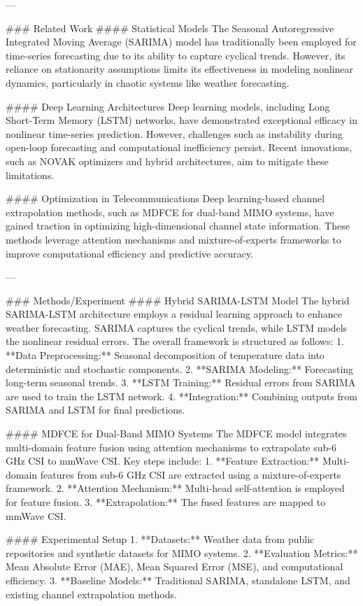 ---

### Related Work
#### Statistical Models
The Seasonal Autoregressive Integrated Moving Average (SARIMA) model has traditionally been employed for time-series forecasting due to its ability to capture cyclical trends. However, its reliance on stationarity assumptions limits its effectiveness in modeling nonlinear dynamics, particularly in chaotic systems like weather forecasting.

#### Deep Learning Architectures
Deep learning models, including Long Short-Term Memory (LSTM) networks, have demonstrated exceptional efficacy in nonlinear time-series prediction. However, challenges such as instability during open-loop forecasting and computational inefficiency persist. Recent innovations, such as NOVAK optimizers and hybrid architectures, aim to mitigate these limitations.

#### Optimization in Telecommunications
Deep learning-based channel extrapolation methods, such as MDFCE for dual-band MIMO systems, have gained traction in optimizing high-dimensional channel state information. These methods leverage attention mechanisms and mixture-of-experts frameworks to improve computational efficiency and predictive accuracy.

---

### Methods/Experiment
#### Hybrid SARIMA-LSTM Model
The hybrid SARIMA-LSTM architecture employs a residual learning approach to enhance weather forecasting. SARIMA captures the cyclical trends, while LSTM models the nonlinear residual errors. The overall framework is structured as follows:
1. **Data Preprocessing:** Seasonal decomposition of temperature data into deterministic and stochastic components.
2. **SARIMA Modeling:** Forecasting long-term seasonal trends.
3. **LSTM Training:** Residual errors from SARIMA are used to train the LSTM network.
4. **Integration:** Combining outputs from SARIMA and LSTM for final predictions.

#### MDFCE for Dual-Band MIMO Systems
The MDFCE model integrates multi-domain feature fusion using attention mechanisms to extrapolate sub-6 GHz CSI to mmWave CSI. Key steps include:
1. **Feature Extraction:** Multi-domain features from sub-6 GHz CSI are extracted using a mixture-of-experts framework.
2. **Attention Mechanism:** Multi-head self-attention is employed for feature fusion.
3. **Extrapolation:** The fused features are mapped to mmWave CSI.

#### Experimental Setup
1. **Datasets:** Weather data from public repositories and synthetic datasets for MIMO systems.
2. **Evaluation Metrics:** Mean Absolute Error (MAE), Mean Squared Error (MSE), and computational efficiency.
3. **Baseline Models:** Traditional SARIMA, standalone LSTM, and existing channel extrapolation methods.

